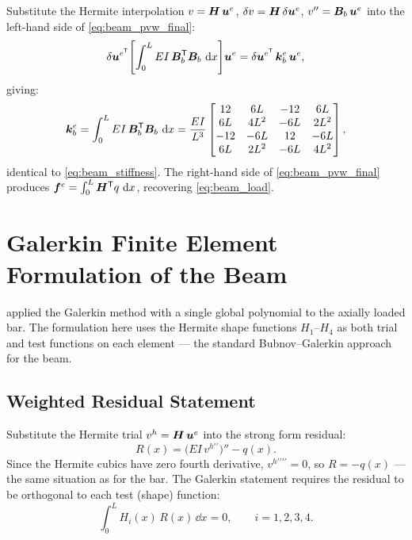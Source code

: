 Substitute the Hermite interpolation $v = \bm{H}\,\bm{u}^e$,
$\delta v = \bm{H}\,\delta\bm{u}^e$, $v'' = \bm{B}_b\,\bm{u}^e$
into the left-hand side of \cref{eq:beam_pvw_final}:
\[
    \delta\bm{u}^{e^{\mathsf{T}}}
    \!\left[\int_0^L EI\,\bm{B}_b^{\mathsf{T}}\bm{B}_b\,\,\mathrm{d} x\right]
    \!\bm{u}^e
    = \delta\bm{u}^{e^{\mathsf{T}}}\,\bm{k}^e_b\,\bm{u}^e ,
\]
giving:
\begin{equation}
    \bm{k}^e_b = \int_0^L EI\,\bm{B}_b^{\mathsf{T}}\bm{B}_b\,\,\mathrm{d} x
    = \frac{EI}{L^3}
    \begin{bmatrix}
        12  &  6L  & -12  &  6L \\
        6L  & 4L^2 & -6L  & 2L^2 \\
       -12  & -6L  &  12  & -6L \\
        6L  & 2L^2 & -6L  & 4L^2
    \end{bmatrix} ,
    \label{eq:beam_pvw_ke}
\end{equation}
identical to \cref{eq:beam_stiffness}. The right-hand side of
\cref{eq:beam_pvw_final} produces $\bm{f}^e = \int_0^L \bm{H}^{\mathsf{T}} q\,\,\mathrm{d} x$,
recovering \cref{eq:beam_load}.

\section{Galerkin Finite Element Formulation of the Beam}
\label{sec:beam_galerkin}

\begin{remark}
 applied the Galerkin method with a single
global polynomial to the axially loaded bar. The formulation here uses the
Hermite shape functions $H_1$--$H_4$ as both trial and test functions on
each element — the standard Bubnov--Galerkin approach for the beam.
\end{remark}

\subsection{Weighted Residual Statement}

Substitute the Hermite trial $v^h = \bm{H}\,\bm{u}^e$ into the strong
form residual:
\begin{equation}
    R(x) = \bigl(EI\,v^{h\prime\prime}\bigr)'' - q(x) .
    \label{eq:beam_galerkin_residual}
\end{equation}
Since the Hermite cubics have zero fourth derivative, $v^{h\prime\prime\prime\prime} = 0$,
so $R = -q(x)$ — the same situation as for the bar. The Galerkin statement
requires the residual to be orthogonal to each test (shape) function:
\begin{equation}
    \int_0^L H_i(x)\,R(x)\,\dd x = 0, \qquad i = 1,2,3,4 .
    \label{eq:beam_galerkin_statement}
\end{equation}


